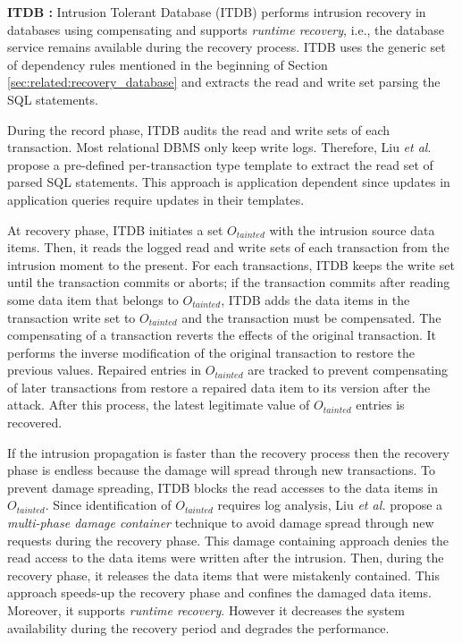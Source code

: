 \textbf{ITDB \cite{itdb,Ammann2002,Wang2007}:} Intrusion Tolerant Database (ITDB) performs intrusion recovery in databases using compensating and supports \textit{runtime recovery}, i.e., the database service remains available during the recovery process. ITDB uses the generic set of dependency rules mentioned in the beginning of Section \ref{sec:related:recovery_database} and extracts the read and write set parsing the \ac{SQL} statements.

During the record phase, ITDB audits the read and write sets of each transaction. Most relational \ac{DBMS} only keep write logs. Therefore, Liu \textit{et al}. \cite{itdb} propose a pre-defined per-transaction type template to extract the read set of parsed \ac{SQL} statements. This approach is application dependent since updates in application queries require updates in their templates. 

At recovery phase, ITDB initiates a set $O_{tainted}$ with the intrusion source data items. Then, it reads the logged read and write sets of each transaction from the intrusion moment to the present. For each transactions, ITDB keeps the write set until the transaction commits or aborts; if the transaction commits after reading some data item that belongs to $O_{tainted}$, ITDB adds the data items in the transaction write set to $O_{tainted}$ and the transaction must be compensated. The compensating of a transaction reverts the effects of the original transaction. It performs the inverse modification of the original transaction to restore the previous values. Repaired entries in $O_{tainted}$ are tracked to prevent compensating of later transactions from restore a repaired data item to its version after the attack. After this process, the latest legitimate value of $O_{tainted}$ entries is recovered.

If the intrusion propagation is faster than the recovery process then the recovery phase is endless because the damage will spread through new transactions. To prevent damage spreading, ITDB blocks the read accesses to the data items in $O_{tainted}$. Since identification of $O_{tainted}$ requires log analysis, Liu \textit{et al.} propose a \textit{multi-phase damage container} technique to avoid damage spread through new requests during the recovery phase. This damage containing approach denies the read access to the data items were written after the intrusion. Then, during the recovery phase, it releases the data items that were mistakenly contained. This approach speeds-up the recovery phase and confines the damaged data items. Moreover, it supports \emph{runtime recovery}. However it decreases the system availability during the recovery period and degrades the performance.

